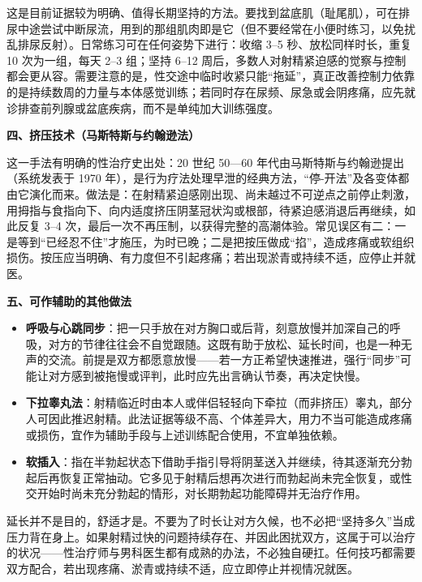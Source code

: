\documentclass[12pt,UTF8]{ctexbook}
\begin{document}
这是目前证据较为明确、值得长期坚持的方法。要找到盆底肌（耻尾肌），可在排尿中途尝试中断尿流，用到的那组肌肉即是它（但不要经常在小便时练习，以免扰乱排尿反射）。日常练习可在任何姿势下进行：收缩 3--5 秒、放松同样时长，重复 10 次为一组，每天 2--3 组；坚持 6--12 周后，多数人对射精紧迫感的觉察与控制都会更从容。需要注意的是，性交途中临时收紧只能“拖延”，真正改善控制力依靠的是持续数周的力量与本体感觉训练；若同时存在尿频、尿急或会阴疼痛，应先就诊排查前列腺或盆底疾病，而不是单纯加大训练强度。

\textbf{四、挤压技术（马斯特斯与约翰逊法）}

这一手法有明确的性治疗史出处：20 世纪 50—60 年代由马斯特斯与约翰逊提出（系统发表于 1970 年），是行为疗法处理早泄的经典方法，“停-开法”及各变体都由它演化而来。做法是：在射精紧迫感刚出现、尚未越过不可逆点之前停止刺激，用拇指与食指向下、向内适度挤压阴茎冠状沟或根部，待紧迫感消退后再继续，如此反复 3--4 次，最后一次不再压制，以获得完整的高潮体验。常见误区有二：一是等到“已经忍不住”才施压，为时已晚；二是把按压做成“掐”，造成疼痛或软组织损伤。按压应当明确、有力度但不引起疼痛；若出现淤青或持续不适，应停止并就医。

\textbf{五、可作辅助的其他做法}

\begin{itemize}
\item \textbf{呼吸与心跳同步}：把一只手放在对方胸口或后背，刻意放慢并加深自己的呼吸，对方的节律往往会不自觉跟随。这既有助于放松、延长时间，也是一种无声的交流。前提是双方都愿意放慢——若一方正希望快速推进，强行“同步”可能让对方感到被拖慢或评判，此时应先出言确认节奏，再决定快慢。
\item \textbf{下拉睾丸法}：射精临近时由本人或伴侣轻轻向下牵拉（而非挤压）睾丸，部分人可因此推迟射精。此法证据等级不高、个体差异大，用力不当可能造成疼痛或损伤，宜作为辅助手段与上述训练配合使用，不宜单独依赖。
\item \textbf{软插入}：指在半勃起状态下借助手指引导将阴茎送入并继续，待其逐渐充分勃起后再恢复正常抽动。它多见于射精后想再次进行而勃起尚未完全恢复，或性交开始时尚未充分勃起的情形，对长期勃起功能障碍并无治疗作用。
\end{itemize}

\begin{tcolorbox}[colback=pink!5!white,colframe=red!50!black,title=贴心小叮咛]
延长并不是目的，舒适才是。不要为了时长让对方久候，也不必把“坚持多久”当成压力背在身上。如果射精过快的问题持续存在、并因此困扰双方，这属于可以治疗的状况——性治疗师与男科医生都有成熟的办法，不必独自硬扛。任何技巧都需要双方配合，若出现疼痛、淤青或持续不适，应立即停止并视情况就医。
\end{tcolorbox}
\end{document}
